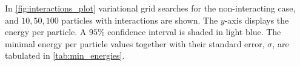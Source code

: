 In \autoref{fig:interactions_plot} variational grid searches for the non-interacting case, and $10, 50, 100$ particles with interactions are shown. The $y$-axis displays the energy per particle. A $95$\% confidence interval is shaded in light blue. The minimal energy per particle values together with their standard error, $\sigma$, are tabulated in \autoref{tab:min_energies}. 
\begin{figure}[!htb]
\centering
{}
\qquad
{}
\qquad
{}

\end{figure}
